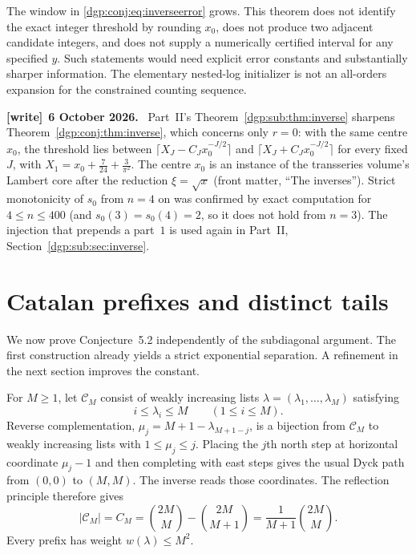\documentclass[11pt,letterpaper]{article}
\numberwithin{equation}{section}
\theoremstyle{remark}\newtheorem{remark}[theorem]{Remark}
\newenvironment{writenote}[1][]{\par\smallskip\begingroup\small
 \noindent\textbf{[write]}\if\relax\detokenize{#1}\relax\else~\textbf{#1.}\fi\ }%
 {\par\endgroup\smallskip}
\begin{document}
The window in \eqref{dgp:conj:eq:inverseerror} grows. This theorem does not
identify the exact integer threshold by rounding $x_0$, does not
produce two adjacent candidate integers, and does not supply a
numerically certified interval for any specified $y$. Such statements
would need explicit error constants and substantially sharper
information. The elementary nested-log initializer is not an
all-orders expansion for the constrained counting sequence.
\begin{writenote}[6 October 2026]
Part~II's Theorem~\ref{dgp:sub:thm:inverse} sharpens Theorem~\ref{dgp:conj:thm:inverse}, which concerns only $r=0$: with the same centre $x_0$, the threshold lies between $\lceil X_J-C_Jx_0^{-J/2}\rceil$ and $\lceil X_J+C_Jx_0^{-J/2}\rceil$ for every fixed $J$, with $X_1=x_0+\frac7{24}+\frac3{\pi^2}$. The centre $x_0$ is an instance of the transseries volume's Lambert core after the reduction $\xi=\sqrt x$ (front matter, ``The inverses''). Strict monotonicity of $s_0$ from $n=4$ on was confirmed by exact computation for $4\le n\le400$ (and $s_0(3)=s_0(4)=2$, so it does not hold from $n=3$). The injection that prepends a part~$1$ is used again in Part~II, Section~\ref{dgp:sub:sec:inverse}.
\end{writenote}

\section{Catalan prefixes and distinct tails}\label{dgp:conj:sec:prefix}
We now prove Conjecture~5.2 independently of the subdiagonal
argument. The first construction already yields a strict
exponential separation. A refinement in the next section improves
the constant.

For $M\geq1$, let $\mathcal C_M$ consist of weakly increasing
lists $\lambda=(\lambda_1,\ldots,\lambda_M)$ satisfying
\begin{equation}\label{dgp:conj:eq:prefixdef}
 i\leq\lambda_i\leq M\qquad(1\leq i\leq M).
\end{equation}
Reverse complementation,
$\mu_j=M+1-\lambda_{M+1-j}$, is a bijection from
$\mathcal C_M$ to weakly increasing lists with $1\leq\mu_j\leq j$.
Placing the $j$th north step at horizontal coordinate $\mu_j-1$
and then completing with east steps gives the usual Dyck path from
$(0,0)$ to $(M,M)$. The inverse reads those coordinates. The
reflection principle therefore gives
\begin{equation}\label{dgp:conj:eq:catalan}
 |\mathcal C_M|=C_M=\binom{2M}{M}-\binom{2M}{M+1}
                  =\frac1{M+1}\binom{2M}{M}.
\end{equation}
Every prefix has weight $w(\lambda)\leq M^2$.
\end{document}
